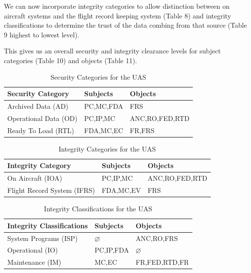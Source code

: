 \documentclass[10pt,journal,compsoc]{IEEEtran}
\begin{document}
We can now incorporate integrity categories to allow distinction between on aircraft systems and the flight record keeping system (Table 8) and integrity classifications to determine the trust of the data combing from that source (Table 9 highest to lowest level).  

This gives us an overall security and integrity clearance levels for subject categories (Table 10) and objects (Table 11).

\begin{table}[]
  \caption{Security Categories for the UAS}
  \label{tab:security-categories}
  \centering
  \begin{tabular}{lll}
  \hline
  \textbf{Security Category} & \textbf{Subjects} & \textbf{Objects} \\
  \hline
  Archived Data (AD)         & PC,MC,FDA         & FRS              \\
  Operational Data (OD)      & PC,IP,MC          & ANC,RO,FED,RTD   \\
  Ready To Load (RTL)        & FDA,MC,EC         & FR,FRS    
  \end{tabular}
\end{table}

\begin{table}[]
  \caption{Integrity Categories for the UAS}
  \label{tab:integrity-categories}
  \centering
  \begin{tabular}{lll}
  \hline
  \textbf{Integrity Category} & \textbf{Subjects} & \textbf{Objects}  \\
  \hline
  On Aircraft (IOA)            & PC,IP,MC        & ANC,RO,FED,RTD \\
  Flight Record System (IFRS)  & FDA,MC,EV       & FRS        
  \end{tabular}
\end{table}

\begin{table}[]
  \caption{Integrity Classifications for the UAS}
  \label{tab:integrity-classifications}
  \centering
  \begin{tabular}{lll}
  \hline
  \textbf{Integrity Classifications} & \textbf{Subjects} & \textbf{Objects} \\
  \hline
  System Programs (ISP)                  & $\varnothing$    & ANC,RO,FRS     \\
  Operational (IO)                       & PC,IP,FDA        & $\varnothing$  \\
  Maintenance (IM)                       & MC,EC            & FR,FED,RTD,FR      
  \end{tabular}
\end{table}
\end{document}
